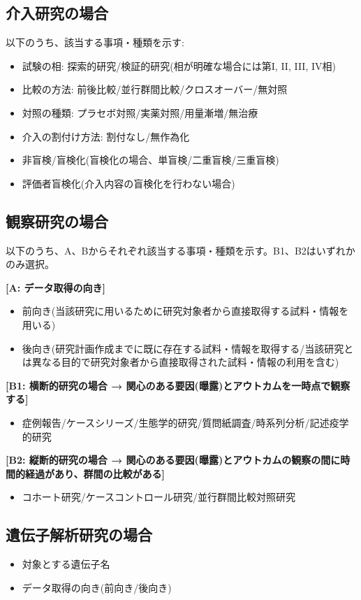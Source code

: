 \documentclass{kyodai-protocol}
\begin{document}
\subsection{介入研究の場合}
以下のうち、該当する事項・種類を示す:
\begin{itemize}
\item 試験の相: 探索的研究/検証的研究(相が明確な場合には第I, II, III, IV相)
\item 比較の方法: 前後比較/並行群間比較/クロスオーバー/無対照
\item 対照の種類: プラセボ対照/実薬対照/用量漸増/無治療
\item 介入の割付け方法: 割付なし/無作為化
\item 非盲検/盲検化(盲検化の場合、単盲検/二重盲検/三重盲検)
\item 評価者盲検化(介入内容の盲検化を行わない場合)
\end{itemize}

\subsection{観察研究の場合}
以下のうち、A、Bからそれぞれ該当する事項・種類を示す。B1、B2はいずれかのみ選択。

\textbf{[A: データ取得の向き]}
\begin{itemize}
\item 前向き(当該研究に用いるために研究対象者から直接取得する試料・情報を用いる)
\item 後向き(研究計画作成までに既に存在する試料・情報を取得する/当該研究とは異なる目的で研究対象者から直接取得された試料・情報の利用を含む)
\end{itemize}

\textbf{[B1: 横断的研究の場合 → 関心のある要因(曝露)とアウトカムを一時点で観察する]}
\begin{itemize}
\item 症例報告/ケースシリーズ/生態学的研究/質問紙調査/時系列分析/記述疫学的研究
\end{itemize}

\textbf{[B2: 縦断的研究の場合 → 関心のある要因(曝露)とアウトカムの観察の間に時間的経過があり、群間の比較がある]}
\begin{itemize}
\item コホート研究/ケースコントロール研究/並行群間比較対照研究
\end{itemize}

\subsection{遺伝子解析研究の場合}
\begin{itemize}
\item 対象とする遺伝子名
\item データ取得の向き(前向き/後向き)
\end{itemize}
\end{document}

